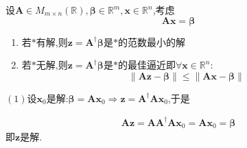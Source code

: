 \begin{formal}
    \begin{theorem}[求解线性方程组]\label{thm:求解线性方程组}
        设$\bm{A}\in M_{m\times n}\left(\mathbb{R}\right),\bm{\beta}\in\mathbb{R}^m,\bm{x}\in\mathbb{R}^n$,考虑\[
        \bm{Ax}=\bm{\beta}\tag{$\ast$}
        \]
        \begin{enumerate}[label=\textup{(\arabic*)}]
            \item 若$\ast$有解,则$\bm{z}=\bm{A}^{\dagger}\bm{\beta}$是$\ast$的范数最小的解
            \item 若$\ast$无解,则$\bm{z}=\bm{A}^{\dagger}\bm{\beta}$是$\ast$的最佳逼近即$\forall\bm{x}\in\mathbb{R}^n:$\[
            \left\lVert\bm{A}\bm{z}-\bm{\beta}\right\rVert\leqslant\left\lVert\bm{A}\bm{x}-\bm{\beta}\right\rVert
            \]
        \end{enumerate}
    \end{theorem}
    \begin{Proof}
        $(1)$设$\bm{x}_0$是解:$\bm{\beta}=\bm{Ax}_0\Longrightarrow\bm{z}=\bm{A}^{\dagger}\bm{Ax}_0$,于是

        \begin{align*}
            \bm{Az}=\bm{AA}^{\dagger}\bm{Ax}_0=\bm{Ax}_0=\bm{\beta}
        \end{align*}即$\bm{z}$是解.

        



\begin{tikzpicture}[x=0.75pt,y=0.75pt,yscale=-1,xscale=1]


\end{tikzpicture}
\end{Proof}
\end{formal}
